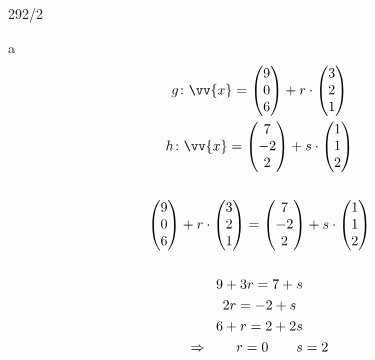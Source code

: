 \newpage
\begin{exercise}{292/2}
  \item [a]
  \begin{gather*}
    g \colon \vv{x} = \begin{pmatrix}9 \\ 0 \\ 6\end{pmatrix} + r \cdot \begin{pmatrix}3 \\ 2 \\ 1\end{pmatrix} \\
    h \colon \vv{x} = \begin{pmatrix}7 \\ -2 \\ 2\end{pmatrix} + s \cdot \begin{pmatrix}1 \\ 1 \\ 2\end{pmatrix} \\\\
    \begin{pmatrix}9 \\ 0 \\ 6\end{pmatrix} + r \cdot \begin{pmatrix}3 \\ 2 \\ 1\end{pmatrix} = \begin{pmatrix}7 \\ -2 \\ 2\end{pmatrix} + s \cdot \begin{pmatrix}1 \\ 1 \\ 2\end{pmatrix} \\\\
    9 + 3r = 7 + s \\
    2r = -2 + s \\
    6 + r = 2 + 2s \\
    \Rightarrow \qquad r = 0 \qquad s = 2 \\\\

\end{gather*}
\end{exercise}
